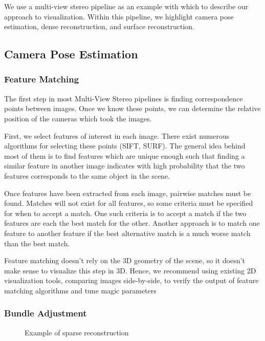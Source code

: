 \documentclass[10pt,twocolumn,letterpaper]{article}
\begin{document}
We use a multi-view stereo pipeline as an example with which to describe our approach to visualization. Within this pipeline, we highlight camera pose estimation, dense reconstruction, and surface reconstruction. 

\subsection{Camera Pose Estimation}

\subsubsection{Feature Matching}
The first step in most Multi-View Stereo pipelines is finding correspondence points between images. Once we know these points, we can determine the relative position of the cameras which took the images.

First, we select features of interest in each image. There exist numerous algorithms for selecting these points (SIFT, SURF). The general idea behind most of them is to find features which are unique enough such that finding a similar feature in another image indicates with high probability that the two features corresponds to the same object in the scene.\cite{brown}

Once features have been extracted from each image, pairwise matches must be found. Matches will not exist for all features, so some criteria must be specified for when to accept a match. One such criteria is to accept a match if the two features are each the best match for the other. Another approach is to match one feature to another feature if the best alternative match is a much worse match than the best match.\cite{brown}

Feature matching doesn't rely on the 3D geometry of the scene, so it doesn't make sense to visualize this step in 3D. Hence, we recommend using existing 2D visualization tools, comparing images side-by-side, to verify the output of feature matching algorithms and tune magic parameters

\subsubsection{Bundle Adjustment}

\begin{figure}[t]
  \begin{center}
    \fbox{\rule{0pt}{2in} \rule{0.9\linewidth}{0pt}}
  \end{center}
  \caption{Example of sparse reconstruction}
  \label{fig:long}
  \label{fig:onecol}
\end{figure}
\end{document}
